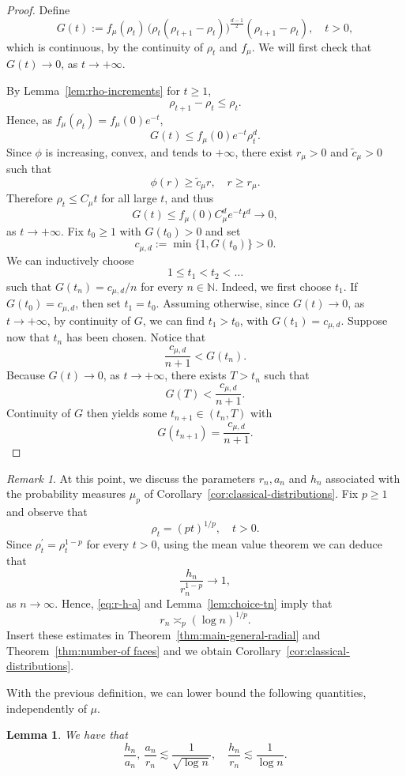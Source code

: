\documentclass[10pt]{amsart}
\newcommand{\1}{\textbf{1}}
\numberwithin{equation}{section} %
\newtheorem{lemma}[theorem]{Lemma}
\theoremstyle{remark}
\newtheorem{remark}[theorem]{Remark}
\theoremstyle{definition}
\begin{document}
\begin{proof}
Define
\[
G(t):=f_\mu(\rho_t)\,
\bigl(\rho_t(\rho_{t+1}-\rho_t)\bigr)^{\frac{d-1}{2}}
(\rho_{t+1}-\rho_t), \quad t>0,
\]
which is continuous, by the continuity of $\rho_t$ and $f_\mu$. We will first check that \(G(t)\to 0\), as $t \to +\infty$.

By Lemma~\ref{lem:rho-increments} for $t \geq 1$, \[\rho_{t+1}-\rho_t\le \rho_t.\] Hence, as $f_\mu(\rho_t)=f_\mu(0)e^{-t}$,
\[
G(t)\le f_\mu(0)e^{-t}\rho_t^d.
\]
Since \(\phi\) is increasing, convex, and tends to \(+\infty\), there exist \(r_\mu>0\) and \(\tilde{c}_\mu>0\) such that
\[
\phi(r)\ge \tilde{c}_\mu r,
\quad r\ge r_\mu.
\]
Therefore \(\rho_t\le C_\mu t\) for all large \(t\), and thus
\[
G(t)\le f_\mu(0)C_\mu^d e^{-t}t^d\to 0, 
\]
as $ t \to +\infty$. Fix \(t_0 \geq 1\) with \(G(t_0)>0\) and set \[c_{\mu,d}:=\min\{1,G(t_0)\}>0.\] We can inductively choose \[1 \leq t_1<t_2<\ldots\] such that $G(t_n)=c_{\mu,d}/n$ for every $n \in \mathbb{N}$. Indeed, we first choose $t_1$. If $G(t_0)=c_{\mu,d}$, then set $t_1=t_0$. Assuming otherwise, since $G(t) \to 0$, as $t \to +\infty$, by continuity of $G$, we can find $t_1 > t_0$, with $G(t_1)=c_{\mu,d}$. Suppose now that $t_n$ has been chosen. Notice that \[\frac{c_{\mu,d}}{n+1}<G(t_n).\] Because $G(t) \to 0$, as $t \to +\infty$, there exists $T>t_n$ such that \[G(T)< \frac{c_{\mu,d}}{n+1}.\] Continuity of $G$ then yields some $t_{n+1} \in (t_n,T)$ with \[G(t_{n+1})=\frac{c_{\mu,d}}{n+1}.\]
\end{proof}

\begin{remark}
    At this point, we discuss the parameters $r_n,a_n$ and $h_n$ associated with the probability measures $\mu_p$ of Corollary~\ref{cor:classical-distributions}. Fix $p \geq 1$ and observe that \[\rho_t=(pt)^{1/p}, \quad t>0.\] Since $\rho_t^\prime=\rho_t^{1-p}$ for every $t>0$, using the mean value theorem we can deduce that \[\frac{h_n}{r_n^{1-p}}\to 1,\] as $n \to \infty$. Hence, \eqref{eq:r-h-a} and Lemma~\ref{lem:choice-tn} imply that \[r_n\asymp_p (\log n)^{1/p}.\] Insert these estimates in Theorem~\ref{thm:main-general-radial} and Theorem~\ref{thm:number-of faces} and we obtain Corollary~\ref{cor:classical-distributions}.
\end{remark}

With the previous definition, we can lower bound the following quantities, independently of $\mu$.
\begin{lemma}\label{lem:relations}
We have that \[\frac{h_n}{a_n}, \ \frac{a_n}{r_n} \lesssim \frac{1}{\sqrt{\log n}}, \quad \frac{h_n}{r_n} \lesssim \frac{1}{\log n}.\]  
\end{lemma}
\end{document}
